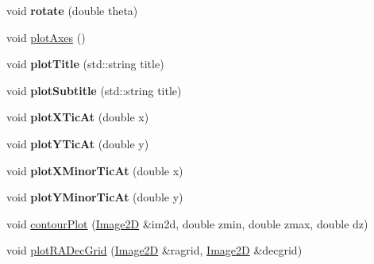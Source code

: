 \begin{DoxyCompactItemize}
\item 
\hypertarget{classPlotMaker_ae7c404f448b8cc74511d551b92458228}{
void {\bfseries rotate} (double theta)}
\label{classPlotMaker_ae7c404f448b8cc74511d551b92458228}

\item 
void \hyperlink{classPlotMaker_a7a63b2f17f113ee6b880aebf1cba1d91}{plotAxes} ()
\item 
\hypertarget{classPlotMaker_a3a11fc277ef5c7d4e930e59c7143b6e7}{
void {\bfseries plotTitle} (std::string title)}
\label{classPlotMaker_a3a11fc277ef5c7d4e930e59c7143b6e7}

\item 
\hypertarget{classPlotMaker_af0b3512703d49e299160fd7b51b279dd}{
void {\bfseries plotSubtitle} (std::string title)}
\label{classPlotMaker_af0b3512703d49e299160fd7b51b279dd}

\item 
\hypertarget{classPlotMaker_a6d5d4f5c931e29e6a86e965db5295a96}{
void {\bfseries plotXTicAt} (double x)}
\label{classPlotMaker_a6d5d4f5c931e29e6a86e965db5295a96}

\item 
\hypertarget{classPlotMaker_a447e61e617e561e98a5ede300966f6d6}{
void {\bfseries plotYTicAt} (double y)}
\label{classPlotMaker_a447e61e617e561e98a5ede300966f6d6}

\item 
\hypertarget{classPlotMaker_ac34e90082c9d8265b635ca22a3ff86b4}{
void {\bfseries plotXMinorTicAt} (double x)}
\label{classPlotMaker_ac34e90082c9d8265b635ca22a3ff86b4}

\item 
\hypertarget{classPlotMaker_a59d9a8f9cc9fe2f147b4ba2afa1d5a30}{
void {\bfseries plotYMinorTicAt} (double y)}
\label{classPlotMaker_a59d9a8f9cc9fe2f147b4ba2afa1d5a30}

\item 
\hypertarget{classPlotMaker_adb2a812fbb301328eb209d1896f7b8fb}{
void \hyperlink{classPlotMaker_adb2a812fbb301328eb209d1896f7b8fb}{contourPlot} (\hyperlink{classImage2D}{Image2D} \&im2d, double zmin, double zmax, double dz)}
\label{classPlotMaker_adb2a812fbb301328eb209d1896f7b8fb}

\item 
\hypertarget{classPlotMaker_ab0317d7d940dff6bee43356cbfebc627}{
void \hyperlink{classPlotMaker_ab0317d7d940dff6bee43356cbfebc627}{plotRADecGrid} (\hyperlink{classImage2D}{Image2D} \&ragrid, \hyperlink{classImage2D}{Image2D} \&decgrid)}
\label{classPlotMaker_ab0317d7d940dff6bee43356cbfebc627}


\end{DoxyCompactItemize}
